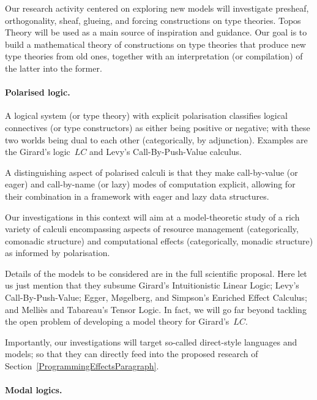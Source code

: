 \documentclass[11pt,twocolumn]{article}
\newcommand{\hl}[1]{#1}%
\newcommand{\LC}{\mbox{$LC$}}
\begin{document}
Our \hl{research} activity centered on exploring new models will investigate
pre\-sheaf, orthogonality, sheaf, glueing, and forcing constructions on type
theories.  Topos Theory %
will be used as a main source of inspiration and guidance.  Our \hl{goal}
is to build a mathematical theory of constructions on type theories that
produce new type theories from old ones, together with an interpretation
(or compilation) of the latter into the former.

\paragraph{Polarised logic.}
\label{PolarisationParagraph}

A logical system (or type theory) with explicit polarisation classifies
logical connectives (or type constructors) as either being positive or
negative; with these two worlds being dual to each other (categorically, by
adjunction).  Examples are the Girard's logic~{\LC} %
and Levy's Call-By-Push-Value calculus. %

A distinguishing aspect of polarised calculi is that they make call-by-value
(or eager) and call-by-name (or lazy) modes of computation explicit, allowing
for their combination in a framework with eager and lazy data structures.

Our investigations in this context will \hl{aim} at a model-theoretic study of
a rich variety of calculi encompassing aspects of resource management
(categorically, comonadic structure) %
and computational effects (categorically, monadic 
structure) %
as informed by polarisation.

Details of the models to be considered are in the full scientific proposal.
Here let us just mention that they subsume 
%
Girard's Intuitionistic Linear Logic; %
%
Levy's Call-By-Push-Value; %
%
Egger, M{\o}gelberg, and Simpson's Enriched Effect Calculus; %
and
%
Melli\`es and Tabareau's Tensor Logic. %
%
In fact, we will go far beyond tackling the open \hl{problem} of developing a
model theory for Girard's~\LC.

Importantly, our investigations will target so-called direct-style languages
and models; so that they can directly feed into the proposed research of
Section~\ref{ProgrammingEffectsParagraph}.

\paragraph{Modal logics.}
\label{ModalLogicsParagraph}
\end{document}

